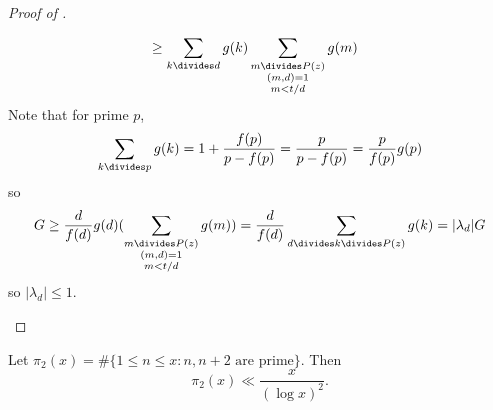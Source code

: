 \documentclass[a4paper]{article}
\theoremstyle{definition}
\begin{document}
\begin{proof}[Proof of ]
\begin{enumerate}
\begin{align*}
      &\geq \sum_{k \divides d} g(k) \sum_{\substack{m \divides P(z) \\ (m, d) = 1 \\ m < t/d}} g(m)
    \end{align*}
    Note that for prime \(p\),
    \[
      \sum_{k \divides p} g(k)
      = 1 + \frac{f(p)}{p - f(p)}
      = \frac{p}{p - f(p)}
      = \frac{p}{f(p)} g(p)
    \]
    so
    \[
      G
      \geq \frac{d}{f(d)} g(d) ( \sum_{\substack{m \divides P(z) \\ (m, d) = 1 \\ m < t/d}} g(m))
      = \frac{d}{f(d)} \sum_{d \divides k \divides P(z)} g(k)
      = |\lambda_d| G
    \]
    so \(|\lambda_d| \leq 1\).
  \end{enumerate}
\end{proof}

\begin{theorem}[Brun]
  Let \(\pi_2(x) = \#\{1 \leq n \leq x: n, n + 2 \text{ are prime}\}\). Then
  \[
    \pi_2(x) \ll \frac{x}{(\log x)^2}.
  \]
\end{theorem}
\end{document}
